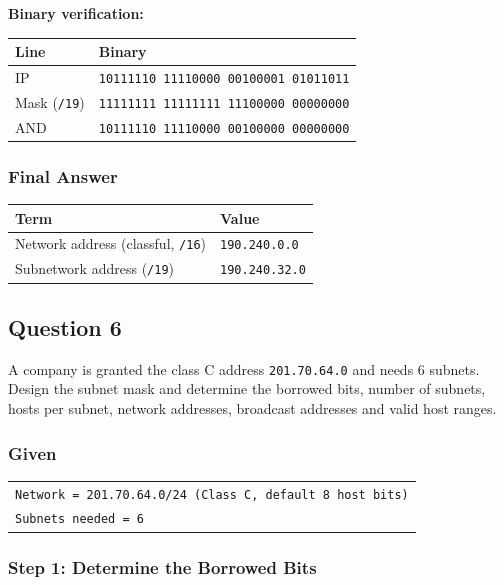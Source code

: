 \documentclass[11pt,a4paper]{article}
\begin{document}
\textbf{Binary verification:}

\begin{tabularx}{\textwidth}{@{}lX@{}}
\toprule
\rowcolor{tablehead}\textbf{Line} & \textbf{Binary} \\
\midrule
IP & \texttt{10111110 11110000 00100001 01011011} \\
Mask (\texttt{/19}) & \texttt{11111111 11111111 11100000 00000000} \\
AND & \texttt{10111110 11110000 00100000 00000000} \\
\bottomrule
\end{tabularx}

\subsubsection*{Final Answer}

\begin{tabularx}{\textwidth}{@{}lX@{}}
\toprule
\rowcolor{tablehead}\textbf{Term} & \textbf{Value} \\
\midrule
Network address (classful, \texttt{/16}) & \texttt{190.240.0.0} \\
Subnetwork address (\texttt{/19}) & \texttt{190.240.32.0} \\
\bottomrule
\end{tabularx}

\subsection*{Question 6}

A company is granted the class C address \texttt{201.70.64.0} and needs 6 subnets. Design the
subnet mask and determine the borrowed bits, number of subnets, hosts per subnet, network
addresses, broadcast addresses and valid host ranges.

\subsubsection*{Given}

\begin{tabularx}{\textwidth}{@{}X@{}}
\texttt{Network = 201.70.64.0/24 (Class C, default 8 host bits)} \\
\texttt{Subnets needed = 6} \\
\end{tabularx}

\subsubsection*{Step 1: Determine the Borrowed Bits}
\end{document}

